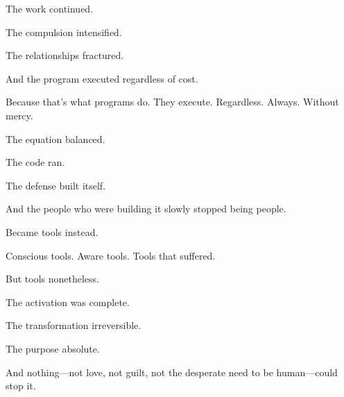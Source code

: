 The work continued.

The compulsion intensified.

The relationships fractured.

And the program executed regardless of cost.

Because that's what programs do. They execute. Regardless. Always. Without mercy.

The equation balanced.

The code ran.

The defense built itself.

And the people who were building it slowly stopped being people.

Became tools instead.

Conscious tools. Aware tools. Tools that suffered.

But tools nonetheless.

The activation was complete.

The transformation irreversible.

The purpose absolute.

And nothing—not love, not guilt, not the desperate need to be human—could stop it.

